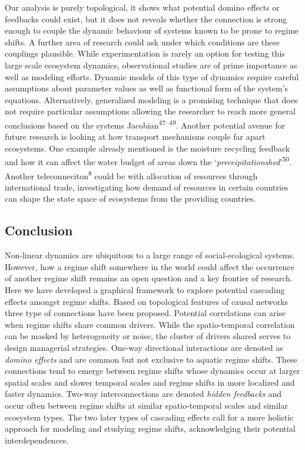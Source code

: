 \documentclass[9pt,]{article}
\begin{document}
Our analysis is purely topological, it shows what potential domino
effects or feedbacks could exist, but it does not reveals whether the
connection is strong enough to couple the dynamic behaviour of systems
known to be prone to regime shifts. A further area of research could ask
under which conditions are these couplings plausible. While
experimentation is rarely an option for testing this large scale
ecosystem dynamics, observational studies are of prime importance as
well as modeling efforts. Dynamic models of this type of dynamics
require careful assumptions about parameter values as well as functional
form of the system's equations. Alternatively, generalized modeling is a
promising technique that does not require particular assumptions
allowing the researcher to reach more general conclusions based on the
systems Jacobian\textsuperscript{47--49}. Another potential avenue for
future research is looking at how transport mechanisms couple far apart
ecosystems. One example already mentioned is the moisture recycling
feedback and how it can affect the water budget of areas down the
`\emph{preceipitationshed}'\textsuperscript{50}. Another
teleconneciton\textsuperscript{8} could be with allocation of resources
through international trade, investigating how demand of resources in
certain countries can shape the state space of ecosystems from the
providing countries.

\subsection{Conclusion}\label{conclusion}

Non-linear dynamics are ubiquitous to a large range of social-ecological
systems. However, how a regime shift somewhere in the world could affect
the occurrence of another regime shift remains an open question and a
key frontier of research. Here we have developed a graphical framework
to explore potential cascading effects amongst regime shifts. Based on
topological features of causal networks three type of connections have
been proposed. Potential correlations can arise when regime shifts share
common drivers. While the spatio-temporal correlation can be masked by
heterogeneity or noise, the cluster of drivers shared serves to design
managerial strategies. One-way directional interactions are denoted as
\emph{domino effects} and are common but not exclusive to aquatic regime
shifts. These connections tend to emerge between regime shifts whose
dynamics occur at larger spatial scales and slower temporal scales and
regime shifts in more localized and faster dynamics. Two-way
interconnections are denoted \emph{hidden feedbacks} and occur often
between regime shifts at similar spatio-temporal scales and similar
ecosystem types. The two later types of cascading effects call for a
more holistic approach for modeling and studying regime shifts,
acknowledging their potential interdependences.
\end{document}
